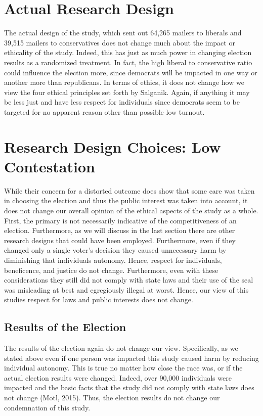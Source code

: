 \documentclass[12pt]{article}
\begin{document}
\section{Actual Research Design}

The actual design of the study, which sent out 64,265 mailers to liberals and 39,515 mailers to conservatives does not change much about the impact or ethicality of the study. Indeed, this has just as much power in changing election results as a randomized treatment. In fact, the high liberal to conservative ratio could influence the election more, since democrats will be impacted in one way or another more than republicans. In terms of ethics, it does not change how we view the four ethical principles set forth by Salganik. Again, if anything it may be less just and have less respect for individuals since democrats seem to be targeted for no apparent reason other than possible low turnout. 

\section{Research Design Choices: Low Contestation}

While their concern for a distorted outcome does show that some care was taken in choosing the election and thus the public interest was taken into account, it does not change our overall opinion of the ethical aspects of the study as a whole. First, the primary is not necessarily indicative of the competitiveness of an election. Furthermore, as we will discuss in the last section there are other research designs that could have been employed. Furthermore, even if they changed only a single voter’s decision they caused unnecessary harm by diminishing that individuals autonomy. Hence, respect for individuals, beneficence, and justice do not change. Furthermore, even with these considerations they still did not comply with state laws and their use of the seal was misleading at best and egregiously illegal at worst. Hence, our view of this studies respect for laws and public interests does not change.

\subsection{Results of the Election}

The results of the election again do not change our view. Specifically, as we stated above even if one person was impacted this study caused harm by reducing individual autonomy. This is true no matter how close the race was, or if the actual election results were changed. Indeed, over 90,000 individuals were impacted and the basic facts that the study did not comply with state laws does not change (Motl, 2015). Thus, the election results do not change our condemnation of this study.
\end{document}
